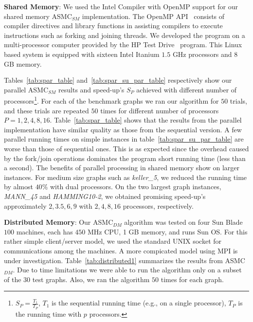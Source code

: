 \documentclass[11pt]{article}
\begin{document}
\textbf{Shared Memory}: We used the Intel Compiler with OpenMP support for our shared memory ASMC$_{SM}$ implementation. The OpenMP API~\cite{OpenMP} consists of compiler directives and library functions in assisting compilers to execute instructions such as forking and joining threads.  We developed the program on a multi-processor computer provided by the HP Test Drive~\cite{HPTestDrive} program. This Linux based system is equipped with sixteen Intel Itanium $1.5$ GHz processors and $8$ GB memory.


Tables~\ref{tab:spar_table} and~\ref{tab:spar_su_par_table} respectively show our parallel ASMC$_{SM}$ results and speed-up's $S_P$ achieved with different number of processors\footnote{$S_P = \frac{T_1}{T_P}$, $T_1$ is the sequential running time (e.g., on a single processor), $T_P$ is the running time with $p$ processors.}. For each of the benchmark graphs we ran our algorithm for $50$ trials, and these trials are repeated $50$ times for different number of processors $P=1,2,4,8,16$.  Table~\ref{tab:spar_table} shows that the results from the parallel implementation have similar quality as those from the sequential version.  A few parallel running times on simple instances in table~\ref{tab:spar_su_par_table} are worse than those of sequential ones. This is as expected since the overhead caused by the fork/join operations dominates the program short running time (less than a second).  The benefits of parallel processing in shared memory show on larger instances.  For medium size graphs such as \textit{keller\_5}, we reduced the running time by almost $40\%$ with dual processors.  On the two largest graph instances, \textit{MANN\_45} and \textit{HAMMING10-2}, we obtained promising speed-up's approximately $2, 3.5, 6, 9$ with $2,4,8,16$ processors, respectively.  %


\textbf{Distributed Memory}: Our ASMC$_{DM}$ algorithm was tested on four Sun Blade $100$ machines, each has $450$ MHz CPU, 1 GB memory, and runs Sun OS.  For this rather simple client/server model, we used the standard UNIX socket for communications among the machines.  A more compicated model using MPI is under investigation.   Table~\ref{tab:distributed1} summarizes the results from ASMC$_{DM}$. Due to time limitations we were able to run the algorithm only on a subset of the $30$ test graphs.  Also, we ran the algorithm $50$ times for each graph. %
\end{document}

